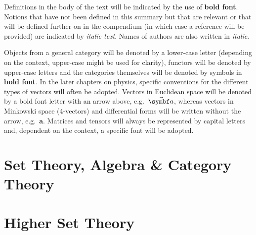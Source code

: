 \documentclass[12pt, a4paper]{report}
\begin{document}
   Definitions in the body of the text will be indicated by the use of \textbf{bold font}. Notions that have not been defined in this summary but that are relevant or that will be defined further on in the compendium (in which case a reference will be provided) are indicated by \textit{italic text}. Names of authors are also written in \textit{italic}.

   Objects from a general category will be denoted by a lower-case letter (depending on the context, upper-case might be used for clarity), functors will be denoted by upper-case letters and the categories themselves will be denoted by symbols in \textbf{bold font}. In the later chapters on physics, specific conventions for the different types of vectors will often be adopted. Vectors in Euclidean space will be denoted by a bold font letter with an arrow above, e.g.~$\vector{a}$, whereas vectors in Minkowski space (4-vectors) and differential forms will be written without the arrow, e.g.~$\symbf{a}$. Matrices and tensors will always be represented by capital letters and, dependent on the context, a specific font will be adopted.

\part{Set Theory, Algebra \& Category Theory}
\insertparttoc


% 


% 


% 
% 
% 
% 
% 
% 

\part{Higher Set Theory}
\insertparttoc

% 
% 
% 


\end{document}
